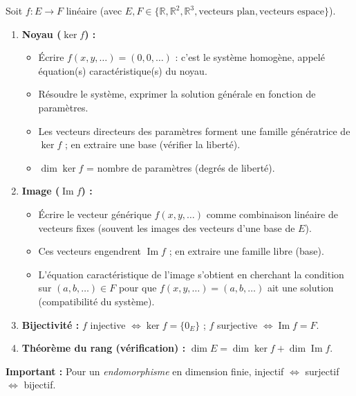 \documentclass[11pt]{article}
\newcommand{\cle}[1]{{\popxbold\color{popdark}#1}}
\begin{document}
\begin{methode}
Soit $f:E\to F$ linéaire (avec $E,F\in\{\mathbb{R},\mathbb{R}^2,\mathbb{R}^3,\text{vecteurs plan},\text{vecteurs espace}\}$).
\begin{enumerate}
\item \textbf{Noyau ($\ker f$) :}
      \begin{itemize}
      \item Écrire $f(x,y,\ldots)=(0,0,\ldots)$ : c'est le système homogène, appelé \cle{équation(s) caractéristique(s) du noyau}.
      \item Résoudre le système, exprimer la solution générale en fonction de paramètres.
      \item Les vecteurs directeurs des paramètres forment une famille génératrice de $\ker f$ ; en extraire une base (vérifier la liberté).
      \item $\dim\ker f$ = nombre de paramètres (degrés de liberté).
      \end{itemize}
\item \textbf{Image ($\operatorname{Im} f$) :}
      \begin{itemize}
      \item Écrire le vecteur générique $f(x,y,\ldots)$ comme combinaison linéaire de vecteurs fixes (souvent les images des vecteurs d'une base de $E$).
      \item Ces vecteurs engendrent $\operatorname{Im} f$ ; en extraire une famille libre (base).
      \item L'\cle{équation caractéristique de l'image} s'obtient en cherchant la condition sur $(a,b,\ldots)\in F$ pour que $f(x,y,\ldots)=(a,b,\ldots)$ ait une solution (compatibilité du système).
      \end{itemize}
\item \textbf{Bijectivité :} $f$ injective $\iff \ker f=\{0_E\}$ ; $f$ surjective $\iff \operatorname{Im} f=F$.
\item \textbf{Théorème du rang (vérification) :} $\dim E=\dim\ker f+\dim\operatorname{Im} f$.
\end{enumerate}
\textbf{Important :} Pour un \emph{endomorphisme} en dimension finie, injectif $\iff$ surjectif $\iff$ bijectif.
\end{methode}
\end{document}
